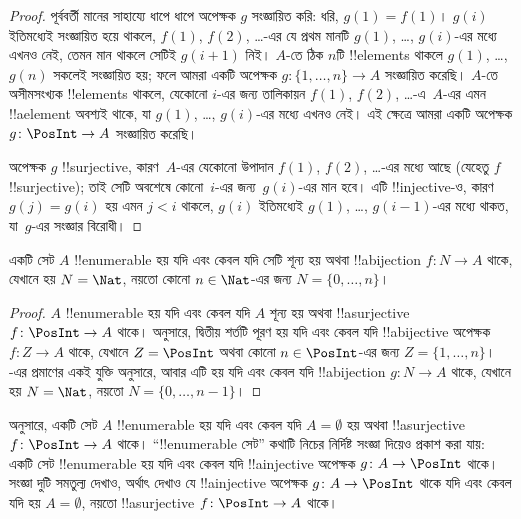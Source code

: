\documentclass[../../../include/open-logic-section]{subfiles}
\begin{document}
\begin{proof}
  পূর্ববর্তী মানের সাহায্যে ধাপে ধাপে অপেক্ষক $g$ সংজ্ঞায়িত করি: ধরি, $g(1) = f(1)$। $g(i)$ ইতিমধ্যেই সংজ্ঞায়িত হয়ে থাকলে, $f(1)$, $f(2)$, \dots{}-এর যে প্রথম মানটি $g(1)$, \dots, $g(i)$-এর মধ্যে এখনও নেই, তেমন মান থাকলে সেটিই $g(i+1)$ নিই। $A$-তে ঠিক $n$টি !!{element}s থাকলে $g(1)$, \dots, $g(n)$ সকলেই সংজ্ঞায়িত হয়; ফলে আমরা একটি অপেক্ষক $g\colon \{1, \dots, n\}
  \to A$ সংজ্ঞায়িত করেছি। $A$-তে অসীমসংখ্যক !!{element}s থাকলে, যেকোনো $i$-এর জন্য তালিকায়ন $f(1)$, $f(2)$, \dots{}-এ~$A$-এর এমন !!a{element} অবশ্যই থাকে, যা $g(1)$, \dots, $g(i)$-এর মধ্যে এখনও নেই। এই ক্ষেত্রে আমরা একটি অপেক্ষক $g\colon \PosInt \to A$ সংজ্ঞায়িত করেছি।

  অপেক্ষক $g$ !!{surjective}, কারণ~$A$-এর যেকোনো উপাদান $f(1)$, $f(2)$, \dots{}-এর মধ্যে আছে (যেহেতু $f$ !!{surjective}); তাই সেটি অবশেষে কোনো~$i$-এর জন্য~$g(i)$-এর মান হবে। এটি !!{injective}-ও, কারণ $g(j) = g(i)$ হয় এমন $j < i$ থাকলে, $g(i)$ ইতিমধ্যেই $g(1)$, \dots, $g(i-1)$-এর মধ্যে থাকত, যা~$g$-এর সংজ্ঞার বিরোধী।
\end{proof}

\begin{cor}
একটি সেট $A$ !!{enumerable} হয় যদি এবং কেবল যদি সেটি শূন্য হয় অথবা !!a{bijection} $f\colon N \to A$ থাকে, যেখানে হয় $N = \Nat$, নয়তো কোনো $n \in \Nat$-এর জন্য $N = \{0, \dots, n\}$।
\end{cor}

\begin{proof}
$A$ !!{enumerable} হয় যদি এবং কেবল যদি $A$ শূন্য হয় অথবা !!a{surjective} $f\colon \PosInt \to A$ থাকে।  অনুসারে, দ্বিতীয় শর্তটি পূরণ হয় যদি এবং কেবল যদি !!a{bijective} অপেক্ষক~$f\colon Z \to A$ থাকে, যেখানে $Z =
\PosInt$ অথবা কোনো $n \in \PosInt$-এর জন্য $Z = \{1, \dots, n\}$। -এর প্রমাণের একই যুক্তি অনুসারে, আবার এটি হয় যদি এবং কেবল যদি !!a{bijection} $g\colon N \to A$ থাকে, যেখানে হয় $N = \Nat$, নয়তো $N = \{0, \dots, n-1\}$।
\end{proof}

\begin{prob}
   অনুসারে, একটি সেট $A$ !!{enumerable} হয় যদি এবং কেবল যদি $A = \emptyset$ হয় অথবা !!a{surjective} $f\colon
  \PosInt \to A$ থাকে। ``!!{enumerable} সেট'' কথাটি নিচের নির্দিষ্ট সংজ্ঞা দিয়েও প্রকাশ করা যায়: একটি সেট !!{enumerable} হয় যদি এবং কেবল যদি !!a{injective} অপেক্ষক $g\colon A \to \PosInt$ থাকে। সংজ্ঞা দুটি সমতুল্য দেখাও, অর্থাৎ দেখাও যে !!a{injective} অপেক্ষক $g\colon A \to \PosInt$ থাকে যদি এবং কেবল যদি হয় $A = \emptyset$, নয়তো !!a{surjective} $f\colon \PosInt \to A$ থাকে।
\end{prob}
\end{document}
